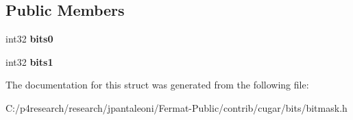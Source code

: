 \subsection*{Public Members}
\begin{DoxyCompactItemize}
\item 
\mbox{\label{structcugar_1_1_bitmask_3_012_01_4_a83aada6c162d434564fde45d4617cd85}} 
int32 {\bfseries bits0}
\item 
\mbox{\label{structcugar_1_1_bitmask_3_012_01_4_a30e5d8368bd2882487fca7440124a877}} 
int32 {\bfseries bits1}
\end{DoxyCompactItemize}


The documentation for this struct was generated from the following file\+:\begin{DoxyCompactItemize}
\item 
C\+:/p4research/research/jpantaleoni/\+Fermat-\/\+Public/contrib/cugar/bits/bitmask.\+h\end{DoxyCompactItemize}
